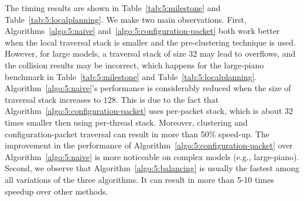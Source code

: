 \begin{table}[!htb]
\begin{center}
\end{center}
\caption[Comparison of different CPU-based and GPU-based algorithms in the local planning component of PRM motion planner]{Comparison of different algorithms in local planning (timing in milliseconds). 32 and 128 are the
different sizes used for the traversal stack; C and no-C means refer to pre-clustering and not using pre-clustering, respectively; the timing of Algorithm~\ref{algo:5:balancing} includes two parts: traversal and balancing.}\label{tab:5:localplanning}
\end{table}

The timing results are shown in Table~\ref{tab:5:milestone} and Table~\ref{tab:5:localplanning}. We make two main observations. First, Algorithms~\ref{algo:5:naive} and~\ref{algo:5:configuration-packet} both work better when the local traversal stack is smaller and the pre-clustering technique is used. However, for large models, a traversal stack of size $32$ may lead to overflows, and the
collision results may be incorrect, which happens for the large-piano benchmark in Table~\ref{tab:5:milestone} and Table~\ref{tab:5:localplanning}. Algorithm~\ref{algo:5:naive}'s performance is considerably reduced when the size of traversal stack
increases to $128$. This is due to the fact that Algorithm~\ref{algo:5:configuration-packet} uses per-packet stack,
which is about $32$ times smaller then using per-thread stack. Moreover, clustering and  configuration-packet traversal
can result in more than 50\% speed-up. The improvement in the performance of
Algorithm~\ref{algo:5:configuration-packet} over Algorithm~\ref{algo:5:naive} is more noticeable on complex models (e.g., large-piano).
Second, we observe that Algorithm~\ref{algo:5:balancing} is usually the fastest among all variations of the three algorithms.
It can result in more than 5-10 times speedup over other methods.


